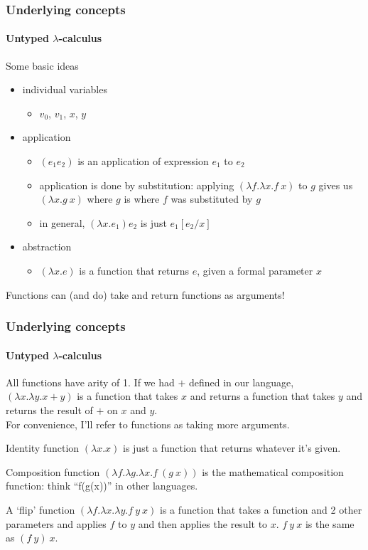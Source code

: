\documentclass{beamer}
\begin{document}
\begin{frame}
  \frametitle{Underlying concepts}
  \framesubtitle{Untyped $\lambda$-calculus }
  Some basic ideas
  \pause
  \begin{itemize}[<+->]
    \item individual variables
      \begin{itemize}
        \item $v_0$, $v_1$, $x$, $y$
      \end{itemize}
    \item application
      \begin{itemize}
        \item $(e_1e_2)$ is an application of expression $e_1$ to
          $e_2$
        \item application is done by substitution: applying $(\lambda f.\lambda
          x.f\:x)$ to $g$ gives us $(\lambda x.g\:x)$ where $g$ is
          where $f$ was substituted by $g$
        \item in general, $(\lambda x.e_1)e_2$ is just $e_1[e_2/x]$
      \end{itemize}
    \item abstraction
      \begin{itemize}
        \item $(\lambda x.e)$ is a function that returns $e$, given a
          formal parameter $x$
      \end{itemize}
  \end{itemize}
  \pause
  Functions can (and do) take and return functions as arguments!
\end{frame}
\begin{frame}
  \frametitle{Underlying concepts}
  \framesubtitle{Untyped $\lambda$-calculus}
  All functions have arity of 1. If we had $+$ defined in our language,
  $(\lambda x.\lambda y. x + y)$ is a function that takes $x$ and
  returns a function that takes $y$ and returns the result of $+$ on
  $x$ and $y$.\\
  \pause
  For convenience, I'll refer to functions as taking more arguments.
  \pause
  \begin{exampleblock}{Identity function}
    $(\lambda x.x)$ is just a function that returns whatever it's
    given.
  \end{exampleblock}
  \pause
  \begin{exampleblock}{Composition function}
    $(\lambda f.\lambda g.\lambda x.f\:(g\:x))$ is the mathematical
    composition function: think ``f(g(x))'' in other languages.
  \end{exampleblock}
  \pause
  \begin{exampleblock}{A `flip' function}
    $(\lambda f.\lambda x.\lambda y.f\:y\:x)$ is a function
    that takes a function and 2 other parameters and applies $f$ to
    $y$ and then applies the result to $x$. $f\:y\:x$ is the same as $(f\:y)\:x$.
  \end{exampleblock}
\end{frame}
\end{document}

